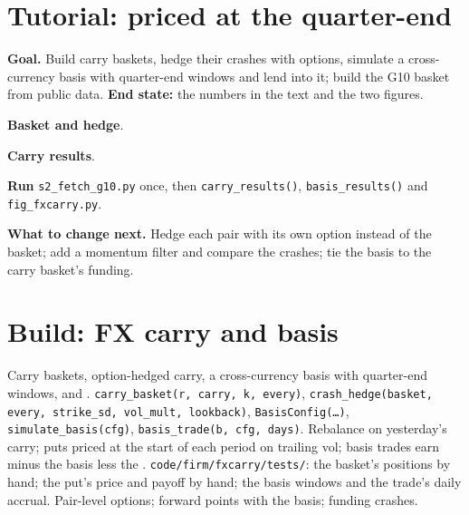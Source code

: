 \section{Tutorial: priced at the quarter-end}\label{tut:s2:cross-currency-basis-and-fx-carry:tut}

\begin{tutorial}
\textbf{Goal.} Build carry baskets, hedge their crashes with options, simulate a cross-currency basis with quarter-end windows and lend into it;
build the G10 basket from public data. \textbf{End state:} the numbers in the text and the two figures.
\begin{tutsteps}
\item \textbf{Basket and hedge}.
\label{lst:s2:cross-currency-basis-and-fx-carry:hedge}
\item \textbf{Carry results}.
\label{lst:s2:cross-currency-basis-and-fx-carry:results}
\item \textbf{Run} \texttt{s2\_fetch\_g10.py} once, then \texttt{carry\_results()}, \texttt{basis\_results()} and \texttt{fig\_fxcarry.py}.
\end{tutsteps}
\textbf{What to change next.} Hedge each pair with its own option instead of the basket; add a momentum filter and compare the crashes; tie the basis
to the carry basket's funding.
\end{tutorial}

\section{Build: FX carry and basis}\label{bld:s2:cross-currency-basis-and-fx-carry:fxcarry}

\begin{build}
 Carry baskets, option-hedged carry, a cross-currency basis with quarter-end windows, and .
 \texttt{carry\_basket(r, carry, k, every)}, \texttt{crash\_hedge(basket, every, strike\_sd, vol\_mult, lookback)},
\texttt{BasisConfig(\dots)}, \texttt{simulate\_basis(cfg)}, \texttt{basis\_trade(b, cfg, days)}.
 Rebalance on yesterday's carry; puts priced at the start of each period on trailing vol; basis trades earn minus the basis less the
.
 \texttt{code/firm/fxcarry/tests/}: the basket's positions by hand; the put's price and payoff by hand; the basis windows
and the trade's daily accrual.
 Pair-level options; forward points with the basis; funding crashes.
\end{build}

